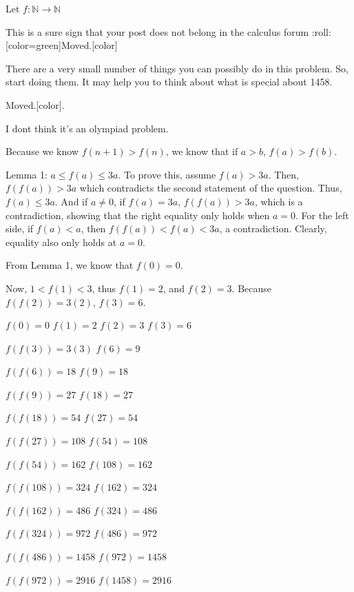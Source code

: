 \begin{solution}
	\begin{tcolorbox}Let $ f : \mathbb{N}\rightarrow \mathbb{N}$\end{tcolorbox}  This is a sure sign that your post does not belong in the calculus forum  :roll: 
[color=green]Moved.[\/color]

There are a very small number of things you can possibly do in this problem.  So, start doing them.  It may help you to think about what is special about 1458.
\end{solution}



\begin{solution}
	\begin{tcolorbox} [This is a sure sign that your post does not belong in the calculus forum  :roll: 
[color=green]Moved.[\/color].\end{tcolorbox}

I dont think it's an olympiad problem.
\end{solution}



\begin{solution}
	Because we know $ f(n+1) > f(n)$, we know that if $ a > b$, $ f(a) > f(b)$.

Lemma 1: $ a \le f(a) \le 3a$.
To prove this, assume $ f(a) > 3a$. Then, $ f(f(a))>3a$ which contradicts the second statement of the question. Thus, $ f(a) \le 3a$. And if $ a \neq 0$, if $ f(a) = 3a$, $ f(f(a)) > 3a$, which is a contradiction, showing that the right equality only holds when $ a = 0$. For the left side, if $ f(a) < a$, then $ f(f(a)) < f(a) < 3a$, a contradiction. Clearly, equality also only holds at $ a = 0$.

From Lemma 1, we know that $ f(0)=0$.

Now, $ 1 < f(1) < 3$, thus $ f(1) = 2$, and $ f(2) = 3$. Because $ f(f(2)) = 3(2)$, $ f(3) = 6$.

$ f(0)=0$
$ f(1)=2$
$ f(2)=3$
$ f(3)=6$

$ f(f(3))=3(3)$
$ f(6)=9$

$ f(f(6))=18$
$ f(9)=18$

$ f(f(9))=27$
$ f(18)=27$

$ f(f(18))=54$
$ f(27)=54$

$ f(f(27))=108$
$ f(54)=108$

$ f(f(54))=162$
$ f(108)=162$

$ f(f(108))=324$
$ f(162)=324$

$ f(f(162))=486$
$ f(324)=486$

$ f(f(324))=972$
$ f(486)=972$

$ f(f(486))=1458$
$ f(972)=1458$

$ f(f(972))=2916$
$ f(1458)=2916$
\end{solution}



